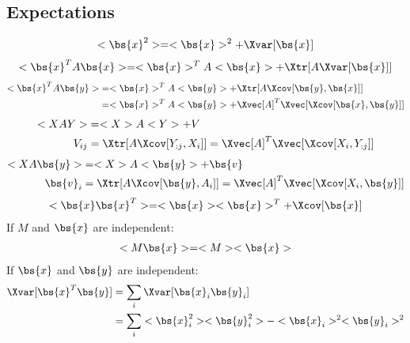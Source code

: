 \begin{appendices}

\section{Expectations}
\newcommand{\Xvx}{\bs{x}}
\newcommand{\Xvy}{\bs{y}}

\begin{align}
  \label{eq:x2}
  <\bs{x}^2>=<\bs{x}>^2+\Xvar[\bs{x}]
\end{align}
\begin{align}
  \label{eq:xAx}
  <\bs{x}^T A \bs{x}>=<\bs{x}>^T A <\bs{x}> + \Xtr[A \Xvar[\bs{x}]]
\end{align}
\begin{align}
  \label{eq:xAy}
  <\bs{x}^T A \bs{y}>
  &=<\bs{x}>^T A <\bs{y}> + \Xtr[A \Xcov[\bs{y},\bs{x}]] \\
  &=<\bs{x}>^T A <\bs{y}> + \Xvec[A]^T\Xvec[\Xcov[\bs{x},\bs{y}]]
\end{align}
\begin{align}
  \label{eq:XAY}
  <X A Y>&=<X>A<Y>+V \\
  V_{ij}&=\Xtr[A\Xcov[Y_{:j},X_i]]=\Xvec[A]^T\Xvec[\Xcov[X_i,Y_{:j}]] \nonumber
\end{align}
\begin{align}
  \label{eq:XAy}
  <X A \bs{y}>&=<X>A<\bs{y}>+\bs{v} \\
  \bs{v}_{i}&=\Xtr[A\Xcov[\bs{y},A_i]]=\Xvec[A]^T\Xvec[\Xcov[X_i,\bs{y}]] \nonumber
\end{align}
\begin{align}
  \label{eq:xx}
  <\bs{x}\bs{x}^T>=<\bs{x}><\bs{x}>^T+ \Xcov[\bs{x}]
\end{align}
If $M$ and $\Xvx$ are independent:
\begin{align}
  \label{eq:Mx}
  <M \Xvx>=<M><\Xvx>
\end{align}
If $\Xvx$ and $\Xvy$ are independent:
\begin{align}
  \Xvar[\Xvx^T\Xvy]
  &=\sum_i \Xvar[\Xvx_i \Xvy_i] \nonumber\\
  &=\sum_i <\Xvx_i^2><\Xvy_i^2> - <\Xvx_i>^2<\Xvy_i>^2 \label{eq:vxy}
\end{align}

\end{appendices}
